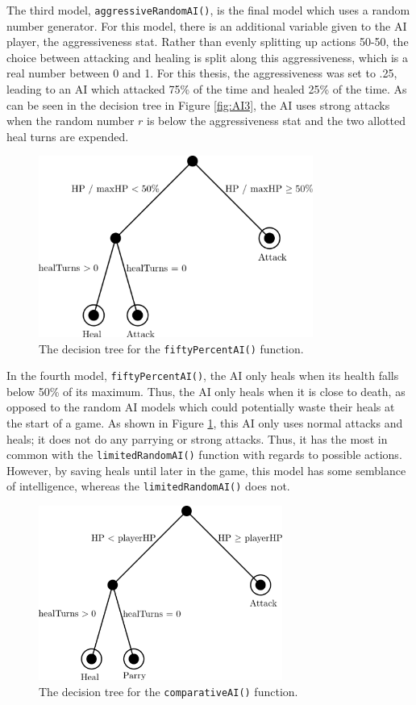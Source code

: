 The third model, \texttt{aggressiveRandomAI()}, is the final model which uses a random number generator. For this model, there is an additional variable given to the AI player, the aggressiveness stat. Rather than evenly splitting up actions 50-50, the choice between attacking and healing is split along this aggressiveness, which is a real number between 0 and 1. For this thesis, the aggressiveness was set to .25, leading to an AI which attacked 75\% of the time and healed 25\% of the time. As can be seen in the decision tree in Figure \ref{fig:AI3}, the AI uses strong attacks when the random number $r$ is below the aggressiveness stat and the two allotted heal turns are expended.

\begin{figure}[H]
  \centering
  \includegraphics[width=9cm]{figures/AI50Percent.png}
  \caption{The decision tree for the \texttt{fiftyPercentAI()} function.}
  \label{fig:AI4}
\end{figure}

In the fourth model, \texttt{fiftyPercentAI()}, the AI only heals when its health falls below 50\% of its maximum. Thus, the AI only heals when it is close to death, as opposed to the random AI models which could potentially waste their heals at the start of a game. As shown in Figure \ref{fig:AI4}, this AI only uses normal attacks and heals; it does not do any parrying or strong attacks. Thus, it has the most in common with the \texttt{limitedRandomAI()} function with regards to possible actions. However, by saving heals until later in the game, this model has some semblance of intelligence, whereas the \texttt{limitedRandomAI()} does not.

\begin{figure}[H]
  \centering
  \includegraphics[width=8cm]{figures/AIComparative.png}
  \caption{The decision tree for the \texttt{comparativeAI()} function.}
  \label{fig:AI5}
\end{figure}

